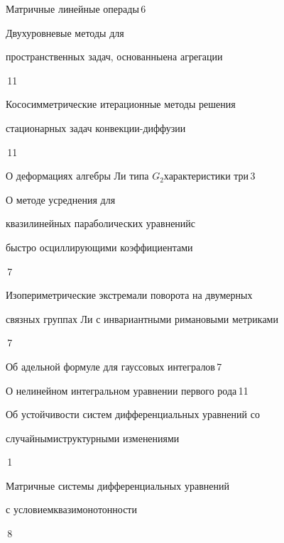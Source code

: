 {Матричные линейные операды}{\No\,6}




{Двухуровневые методы для


пространственных задач, основанные\newline на агрегации}{\No\,11}




{Кососимметрические итерационные методы решения\newline


стационарных задач конвекции-диффузии}{\No\,11}




{О деформациях алгебры Ли типа $G_{2}$\newline характеристики три}{\No\,3}




{О методе усреднения для 


квазилинейных параболических уравнений\newline с 


быстро осциллирующими коэффициентами}{\No\,7}




{Изопериметрические экстремали поворота на двумерных \newline


связных группах Ли с инвариантными римановыми метриками}{\No\,7}




{Об адельной формуле для гауссовых интегралов}{\No\,7}




{О нелинейном интегральном уравнении первого рода}{\No\,11}






{Об устойчивости систем дифференциальных уравнений со 


случайными\newline структурными изменениями}{\No\,1}




{Матричные системы дифференциальных уравнений


с условием\newline квазимонотонности}{\No\,8}


